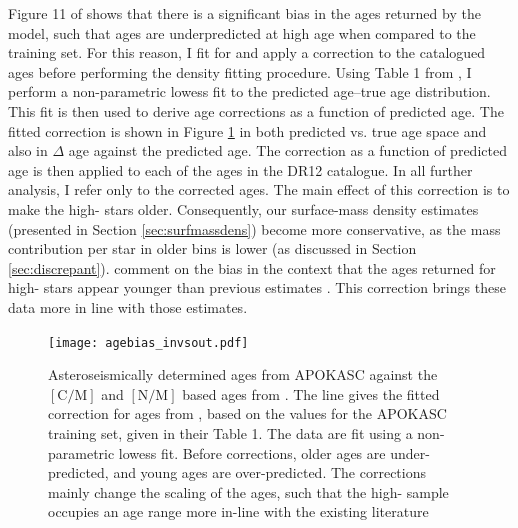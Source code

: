  Figure 11 of \citet{2016MNRAS.456.3655M} shows that there is a significant bias in the ages returned by the model, such that ages are underpredicted at high age when compared to the training set. For this reason, I fit for and apply a correction to the catalogued ages before performing the density fitting procedure. Using Table 1 from \citet{2016MNRAS.456.3655M}, I perform a non-parametric lowess fit to the predicted age--true age distribution. This fit is then used to derive age corrections as a function of predicted age. The fitted correction is shown in Figure \ref{fig:correction} in both predicted vs. true age space and also in $\Delta$ age against the predicted age. The correction as a function of predicted age is then applied to each of the ages in the DR12 catalogue. In all further analysis, I refer only to the corrected ages. The main effect of this correction is to make the high-\afe{} stars older. Consequently, our surface-mass density estimates (presented in Section \ref{sec:surfmassdens}) become more conservative, as the mass contribution per star in older bins is lower (as discussed in Section \ref{sec:discrepant}). \citet{2016MNRAS.456.3655M} comment on the bias in the context that the ages returned for high-\afe{} stars appear younger than previous estimates \citep[from][]{2013A&A...560A.109H,2014A&A...562A..71B,2014A&A...565A..89B}. This correction brings these data more in line with those estimates.  
 
  \begin{figure}
 	\texttt{[image: agebias\_invsout.pdf]}
 	\centering
     \caption[Comparison between the input and output ages from \citet{2016MNRAS.456.3655M}, demonstrating the fit and correction which is applied to the age catalogue for APOGEE DR12]{Asteroseismically determined ages from APOKASC against the $\mathrm{[C/M]}$ and $\mathrm{[N/M]}$ based ages from \citet{2016MNRAS.456.3655M}. The line gives the fitted correction for ages from \citet{2016MNRAS.456.3655M}, based on the values for the APOKASC training set, given in their Table 1. The data are fit using a non-parametric lowess fit. Before corrections, older ages are under-predicted, and young ages are over-predicted. The corrections mainly change the scaling of the ages, such that the high-\afe{} sample occupies an age range more in-line with the existing literature \citep[e.g.][]{2016arXiv160407771A,2013A&A...560A.109H} }
  \label{fig:correction}
\end{figure}



